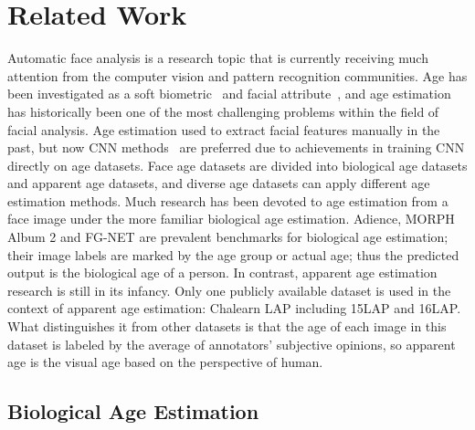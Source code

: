 \documentclass[journal]{IEEEtran}
\begin{document}
\section{Related Work}
\par
Automatic face analysis is a research topic that is currently receiving much attention from the computer vision and pattern recognition communities. Age has been investigated as a soft biometric~\cite{ref-a} and facial attribute~\cite{ref-62}, and age estimation has historically been one of the most challenging problems within the field of facial analysis. Age estimation used to extract facial features manually in the past, but now CNN methods~\cite{ref-22} are preferred due to achievements in training CNN directly on age datasets. Face age datasets are divided into biological age datasets and apparent age datasets, and diverse age datasets can apply different age estimation methods. Much research has been devoted to age estimation from a face image under the more familiar biological age estimation. Adience, MORPH Album 2 and FG-NET are prevalent benchmarks for biological age estimation; their image labels are marked by the age group or actual age; thus the predicted output is the biological age of a person. In contrast, apparent age estimation research is still in its infancy. Only one publicly available dataset is used in the context of apparent age estimation: Chalearn LAP including 15LAP and 16LAP. What distinguishes it from other datasets is that the age of each image in this dataset is labeled by the average of annotators' subjective opinions, so apparent age is the visual age based on the perspective of human.
\subsection{Biological Age Estimation}
\end{document}

